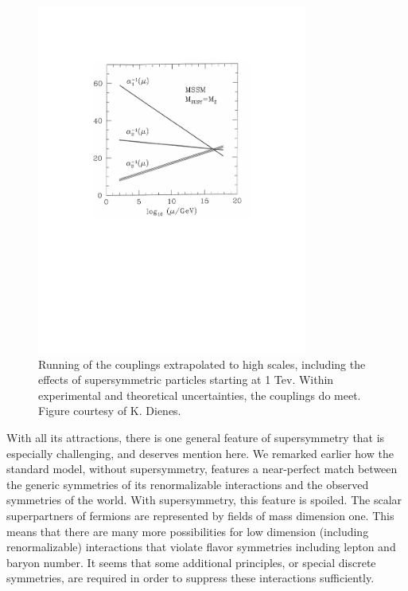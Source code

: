 \documentclass[12pt]{article}
\begin{document}
\begin{figure}
\centerline{\includegraphics[width=3.5in]{cosfig7.pdf}}
\smallskip
\caption{ Running of the
couplings extrapolated to high scales, including the effects of
supersymmetric particles starting at 1 Tev.  Within experimental and
theoretical uncertainties, the couplings do meet. Figure courtesy of
K. Dienes. }
\label{fig3}
\end{figure}



With all its
attractions, there is one general feature of supersymmetry that is
especially challenging, and deserves mention here.  We remarked
earlier how the standard model, without supersymmetry, features a
near-perfect match between the generic symmetries of its renormalizable
interactions and the observed symmetries of the world.  With
supersymmetry, this feature is spoiled.  The scalar superpartners of
fermions are represented by fields of mass dimension one.  This means
that there are many more possibilities for low dimension (including
renormalizable) interactions that violate flavor symmetries including
lepton and baryon number.  It seems that some additional principles,
or special discrete symmetries, are required in order to suppress
these interactions sufficiently.
\end{document}
